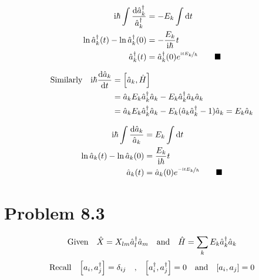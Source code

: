 \documentclass{article}
\begin{document}
\begin{align*}
\text{i}\hbar\int\frac{\dd{\hat{a}_k^\dagger }}{\hat{a}_k^\dagger}&=-E_{k}\int\dd{t} \\
\ln{\hat{a}_k^\dagger(t)}-\ln{\hat{a}_k^\dagger(0)}&=-\frac{E_{k}}{\text{i}\hbar}t \\
\hat{a}_k^\dagger(t)&=\hat{a}_k^\dagger(0)e^{\nicefrac{\text{i}tE_{k}}{\hbar}}\qquad\blacksquare 
\end{align*}

\begin{align*}
\qq*{Similarly} \text{i}\hbar\dv{\hat{a}_k }{t}&= \qty[\hat{a}_k ,\hat{H}]\\
&=\hat{a}_k E_{k}\hat{a}_k^\dagger\hat{a}_k-E_{k}\hat{a}_k^\dagger\hat{a}_k\hat{a}_k \\
&=\hat{a}_k E_{k}\hat{a}_k^\dagger\hat{a}_k-E_{k}(\hat{a}_k\hat{a}_k^\dagger-1)\hat{a}_k =E_{k}\hat{a}_k
\end{align*}

\begin{align*}
\text{i}\hbar\int\frac{\dd{\hat{a}_k }}{\hat{a}_k}&=E_{k}\int\dd{t} \\
\ln{\hat{a}_k(t)}-\ln{\hat{a}_k(0)}&=\frac{E_{k}}{\text{i}\hbar}t \\
\hat{a}_k(t)&=\hat{a}_k(0)e^{\nicefrac{-\text{i}tE_{k}}{\hbar}}\qquad\blacksquare 
\end{align*}


\section*{Problem 8.3}

\[\qq*{Given} \hat{X}= X_{lm}\hat{a}_l^\dagger\hat{a}_m\qq{and}\hat{H}=\sum_k E_k \hat{a}_k^\dagger \hat{a}_k\] 
\[\qq*{Recall} \qty[a_i,a_j^\dagger]=\delta_{ij}\qq{,}\qty[a_i^\dagger,a_j^\dagger]=0\qq{and}\qty[a_i,a_j]=0\]
\end{document}
